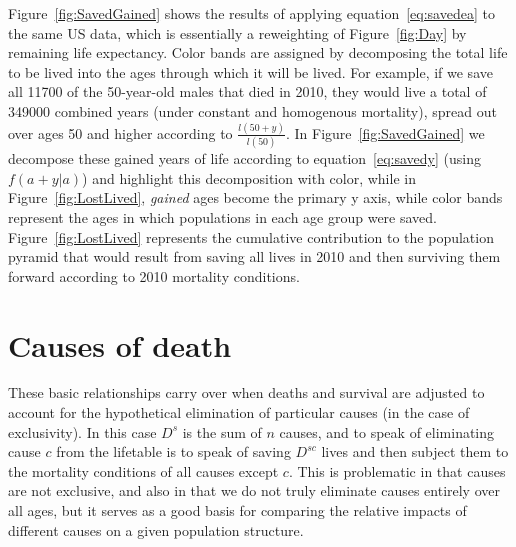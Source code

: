 \documentclass{article}
\begin{document}
Figure~\ref{fig:SavedGained} shows the results of applying
equation~\eqref{eq:savedea} to the same US data, which is essentially a
reweighting of Figure~\ref{fig:Day} by remaining life expectancy. Color bands
are assigned by decomposing the total life to be lived into the ages through
which it will be lived. For example, if we save all 11700 of the 50-year-old
males that died in 2010, they would live a total of 349000 combined years (under
constant and homogenous mortality), spread out over ages 50 and higher according
to $\frac{l(50+y)}{l(50)}$. In Figure~\ref{fig:SavedGained} we decompose these
gained years of life according to equation~\eqref{eq:savedy} (using $f(a+y|a)$)
and highlight this decomposition with color, while in Figure~\ref{fig:LostLived}, \textit{gained} ages become the primary y axis,
while color bands represent the ages in which populations in each age group were
saved. Figure~\ref{fig:LostLived} represents the cumulative contribution to the
population pyramid that would result from saving all lives in 2010 and then
surviving them forward according to 2010 mortality conditions.

\section*{Causes of death}

These basic relationships carry over when deaths and survival are adjusted to
account for the hypothetical elimination of particular causes (in the case of
exclusivity). In this case $D^s$ is the sum of $n$ causes, and to speak of
eliminating cause $c$ from the lifetable is to speak of saving $D^{sc}$ lives and then
subject them to the mortality conditions of all causes except $c$.
This is problematic in that causes are not exclusive, and also in that we do not
truly eliminate causes entirely over all ages, but it serves as a good basis for comparing the relative
impacts of different causes on a given population structure.
\end{document}
